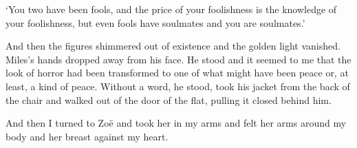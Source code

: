 `You two have been fools, and the price of your foolishness is the
knowledge of your foolishness, but even fools have soulmates and you
are soulmates.'

And then the figures shimmered out of existence and the golden light
vanished. Miles's hands dropped away from his face. He stood and it
seemed to me that the look of horror had been transformed to one of
what might have been peace or, at least, a kind of peace. Without a
word, he stood, took his jacket from the back of the chair and
walked out of the door of the flat, pulling it closed behind him.

And then I turned to Zoë and took her in my arms and felt her
arms around my body and her breast against my heart.
\vfill\eject
